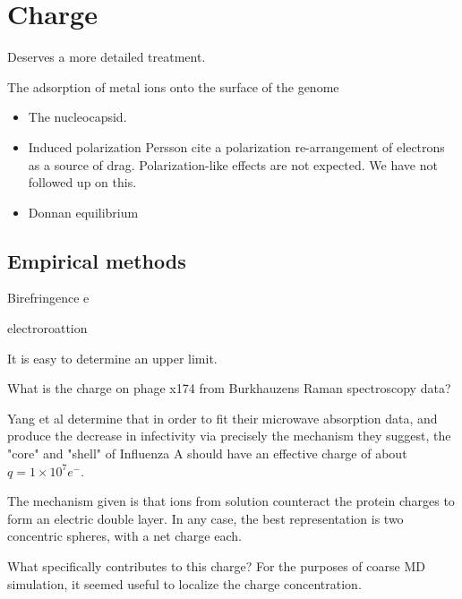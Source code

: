 \documentclass[paper.tex]{subfiles}
\begin{document}
\clearpage
\section{Charge}


\begin{autem}
Deserves a more detailed treatment.
\end{autem}


The adsorption of metal ions onto the surface of the genome
\begin{itemize}
\item The nucleocapsid. 
\item Induced polarization
		Persson cite a polarization re-arrangement of electrons as a source of drag. Polarization-like effects are not expected. We have not followed up on this.
\item Donnan equilibrium
\end{itemize}		




\subsection{Empirical methods}







Birefringence e


electroroattion 


It is easy to determine an upper limit.






\begin{autem}
	What is the charge on phage x174 from Burkhauzens Raman spectroscopy data?
\end{autem}

Yang et al determine that in order to fit their microwave absorption data, and produce the decrease in infectivity via precisely the mechanism they suggest, the "core" and "shell" of Influenza A should have an effective charge of about $q=1 \times 10^7 e^-$. 

The mechanism given is that ions from solution counteract the protein charges to form an electric double layer. In any case, the best representation is two concentric spheres, with a net charge each.

What specifically contributes to this charge? For the purposes of coarse MD simulation, it seemed useful to localize the charge concentration. 
\end{document}
